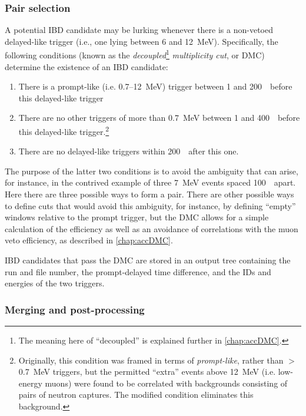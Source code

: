 \documentclass[../thesis.tex]{subfiles}
\begin{document}
\subsubsection{Pair selection}
\label{sec:pairSel}

A potential IBD candidate may be lurking whenever there is a non-vetoed
delayed-like trigger (i.e., one lying between 6 and 12~MeV). Specifically, the
following conditions (known as the \emph{decoupled}\footnote{The meaning here of
  ``decoupled'' is explained further in \autoref{chap:accDMC}.}
\emph{multiplicity cut}, or DMC) determine the existence of an IBD candidate:

\begin{enumerate}
\item There is a prompt-like (i.e. 0.7--12~MeV) trigger between 1 and 200~\us\
  before this delayed-like trigger
\item There are no other triggers of more than 0.7~MeV between 1 and 400~\us\
  before this delayed-like trigger.\footnote{Originally, this condition was
    framed in terms of \emph{prompt-like}, rather than $>$0.7~MeV triggers, but
    the permitted ``extra'' events above 12~MeV (i.e. low-energy muons) were
    found to be correlated with backgrounds consisting of pairs of neutron
    captures. The modified condition eliminates this background.}
\item There are no delayed-like triggers within 200~\us\ after this one.
\end{enumerate}

The purpose of the latter two conditions is to avoid the ambiguity that can
arise, for instance, in the contrived example of three 7~MeV events spaced
100~\us\ apart. Here there are three possible ways to form a pair. There are
other possible ways to define cuts that would avoid this ambiguity, for
instance, by defining ``empty'' windows relative to the prompt trigger, but the
DMC allows for a simple calculation of the efficiency as well as an avoidance of
correlations with the muon veto efficiency, as described in
\autoref{chap:accDMC}.

IBD candidates that pass the DMC are stored in an output tree containing the run
and file number, the prompt-delayed time difference, and the IDs and energies of
the two triggers.

\subsubsection{Merging and post-processing}
\label{sec:selMergingTwo}
\end{document}
